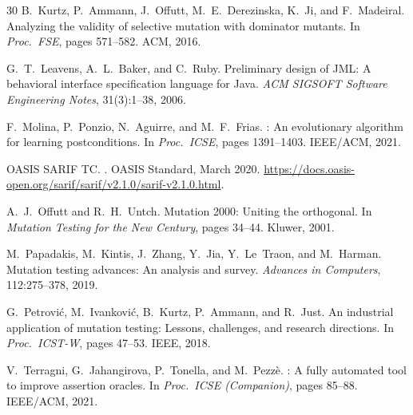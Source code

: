 \documentclass[11pt]{article}
\begin{document}
\begin{thebibliography}{30}
B.~Kurtz, P.~Ammann, J.~Offutt, M.~E.~Derezinska, K.~Ji, and F.~Madeiral.
\newblock Analyzing the validity of selective mutation with dominator mutants.
\newblock In \emph{Proc.\ FSE}, pages 571--582. ACM, 2016.

G.~T.~Leavens, A.~L.~Baker, and C.~Ruby.
\newblock Preliminary design of {JML}: A behavioral interface specification
  language for {Java}.
\newblock \emph{ACM SIGSOFT Software Engineering Notes}, 31(3):1--38, 2006.

F.~Molina, P.~Ponzio, N.~Aguirre, and M.~F.~Frias.
: An evolutionary algorithm for learning postconditions.
\newblock In \emph{Proc.\ ICSE}, pages 1391--1403. IEEE/ACM, 2021.

{OASIS SARIF TC}.
.
\newblock OASIS Standard, March 2020.
\newblock \url{https://docs.oasis-open.org/sarif/sarif/v2.1.0/sarif-v2.1.0.html}.

A.~J.~Offutt and R.~H.~Untch.
\newblock Mutation 2000: Uniting the orthogonal.
\newblock In \emph{Mutation Testing for the New Century}, pages 34--44. Kluwer, 2001.

M.~Papadakis, M.~Kintis, J.~Zhang, Y.~Jia, Y.~Le~Traon, and M.~Harman.
\newblock Mutation testing advances: An analysis and survey.
\newblock \emph{Advances in Computers}, 112:275--378, 2019.

G.~Petrovi\'{c}, M.~Ivankovi\'{c}, B.~Kurtz, P.~Ammann, and R.~Just.
\newblock An industrial application of mutation testing: Lessons, challenges,
  and research directions.
\newblock In \emph{Proc.\ ICST-W}, pages 47--53. IEEE, 2018.

V.~Terragni, G.~Jahangirova, P.~Tonella, and M.~Pezz\`{e}.
: A fully automated tool to improve assertion oracles.
\newblock In \emph{Proc.\ ICSE (Companion)}, pages 85--88. IEEE/ACM, 2021.

\end{thebibliography}
\end{document}
